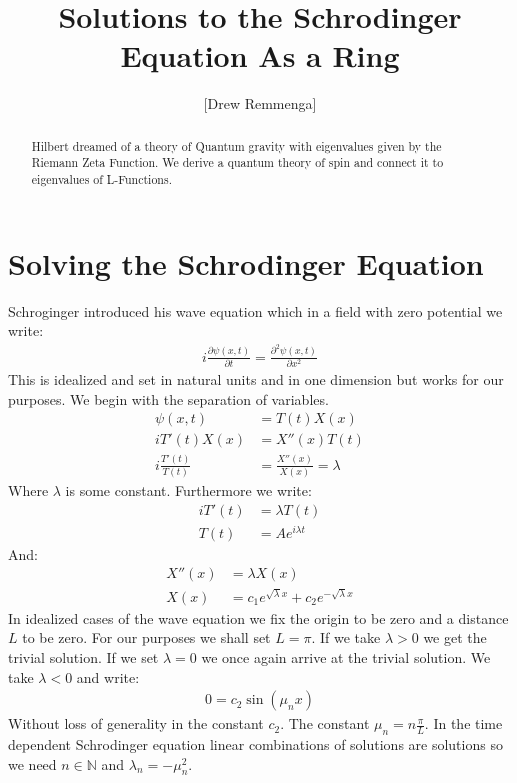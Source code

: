 \documentclass[10pt, oneside]{article}
\title{Solutions to the Schrodinger Equation As a Ring}
\author{[Drew Remmenga]}
\newcommand{\N}{\mathbb{N}}
\begin{document}
\maketitle
\begin{abstract}
  Hilbert dreamed of a theory of Quantum gravity with eigenvalues given by the Riemann Zeta Function. We derive a quantum theory of spin and connect it to eigenvalues of L-Functions.
\end{abstract}
\section{Solving the Schrodinger Equation}
  Schroginger introduced his wave equation \cite{Islam1994} which in a field with zero potential we write:
  \begin{align}
      i \frac{\partial \psi (x,t)}{\partial t} = \frac{\partial^2 \psi (x,t)}{\partial x^2} \label{schrodinger}
  \end{align}
  This is idealized and set in natural units and in one dimension but works for our purposes.
  We begin with the separation of variables.
  \begin{align*}
      \psi (x,t) &= T(t)X(x) \\
      i T'(t) X(x) &= X''(x)T(t) \\
      i \frac{T'(t)}{T(t)} &= \frac{X''(x)}{X(x)} = \lambda
  \end{align*}
  Where $\lambda$ is some constant.
  Furthermore we write:
  \begin{align*}
      i T'(t) &= \lambda T(t) \\
      T(t) &= Ae^{i \lambda t}
  \end{align*}
  And:
  \begin{align*}
      X''(x) &= \lambda X(x) \\
      X(x) &= c_1 e^{\sqrt{\lambda} x} + c_2 e^{-\sqrt{\lambda} x}
  \end{align*}
  In idealized cases of the wave equation we fix the origin to be zero and a distance $L$ to be zero. For our purposes we shall set $L=\pi$.
  If we take $\lambda > 0$ we get the trivial solution. If we set $\lambda = 0$ we once again arrive at the trivial solution.
  We take $\lambda < 0$ and write:
  \begin{align*}
      0 = c_2 \sin (\mu_n x)
  \end{align*}
  Without loss of generality in the constant $c_2$. The constant $\mu_n = n \frac{\pi}{L}$.
  In the time dependent Schrodinger equation linear combinations of solutions are solutions so we need $n \in \N$ and $\lambda_n = -\mu_n^2$.
\end{document}
